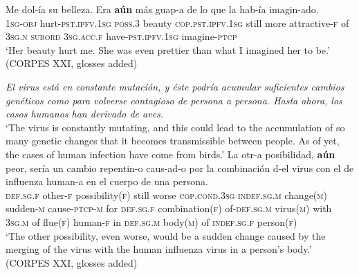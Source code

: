 \begin{exe}
	\ex \gll Me dol-ía su belleza. Era \textbf{aún} más guap-a de lo que la hab-ía imagin-ado.\\
	1\textsc{sg}-\textsc{obj} hurt-\textsc{pst}.\textsc{ipfv}.1\textsc{sg} \textsc{poss}.3 beauty
	\textsc{cop}.\textsc{pst}.\textsc{ipfv}.1\textsc{sg} still more attractive-\textsc{f} of 3\textsc{sg}.\textsc{n} \textsc{subord} 3\textsc{sg}.\textsc{acc}.\textsc{f} have-\textsc{pst}.\textsc{ipfv}.1\textsc{sg} imagine-\textsc{ptcp}\\
	\glt \lq Her beauty hurt me. She was even prettier than what I imagined her to be.' (CORPES XXI, glosses added)

	\ex \textit{El virus está en constante mutación, y éste podría acumular suficientes cambios genéticos como para volverse contagioso de persona a persona. Hasta ahora, los casos humanos han derivado de aves.}\\
	\lq The virus is constantly mutating, and this could lead to the accumulation of so many genetic changes that it becomes transmissible between people. As of yet, the cases of human infection have come from birds.'
	\exi{}\gll 	La otr-a posibilidad, \textbf{aún} peor, sería un cambio repentin-o caus-ad-o por la combinación d-el virus con el de influenza human-a en el cuerpo de una persona.\\
	\textsc{def}.\textsc{sg}.\textsc{f} other-\textsc{f} possibility(\textsc{f}) still worse \textsc{cop}.\textsc{cond}.3\textsc{sg} \textsc{indef}.\textsc{sg}.\textsc{m} change(\textsc{m}) sudden-\textsc{m} cause-\textsc{ptcp}-\textsc{m} for \textsc{def}.\textsc{sg}.\textsc{f} combination(\textsc{f}) of-\textsc{def}.\textsc{sg}.\textsc{m} virus(\textsc{m}) with 3\textsc{sg}.\textsc{m} of flue(\textsc{f}) human-\textsc{f} in \textsc{def}.\textsc{sg}.\textsc{m} body(\textsc{m}) of \textsc{indef}.\textsc{sg}.\textsc{f} person(\textsc{f})\\
	\glt \lq The other possibility, even worse, would be a sudden change caused by the merging of the virus with the human influenza virus in a person's body.' (CORPES XXI, glosses added)
	

\end{exe}
